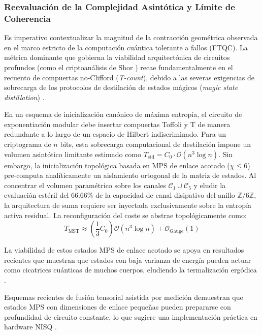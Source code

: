 \documentclass[12pt,a4paper]{article}
\theoremstyle{plain}
\theoremstyle{definition}
\theoremstyle{remark}
\begin{document}
\subsubsection*{Reevaluación de la Complejidad Asintótica y Límite de Coherencia}

Es imperativo contextualizar la magnitud de la contracción geométrica observada en el marco estricto de la computación cuántica tolerante a fallos (FTQC). La métrica dominante que gobierna la viabilidad arquitectónica de circuitos profundos (como el criptoanálisis de Shor \cite{Shor1994}) recae fundamentalmente en el recuento de compuertas no-Clifford (\textit{T-count}), debido a las severas exigencias de sobrecarga de los protocolos de destilación de estados mágicos (\textit{magic state distillation}) \cite{Gidney2021}.

En un esquema de inicialización canónico de máxima entropía, el circuito de exponentiación modular debe insertar compuertas Toffoli y T de manera redundante a lo largo de un espacio de Hilbert indiscriminado. Para un criptograma de $n$ bits, esta sobrecarga computacional de destilación impone un volumen asintótico limitante estimado como $T_{\text{std}} = C_0 \cdot \mathcal{O}(n^3 \log n)$. Sin embargo, la inicialización topológica basada en MPS de enlace acotado ($\chi \le 6$) pre-computa analíticamente un aislamiento ortogonal de la matriz de estados. Al concentrar el volumen paramétrico sobre los canales $\mathcal{C}_1 \cup \mathcal{C}_5$ y eludir la evaluación estéril del $66.66\%$ de la capacidad de canal disipativo del anillo $\mathbb{Z}/6\mathbb{Z}$, la arquitectura de suma requiere ser inyectada exclusivamente sobre la entropía activa residual. La reconfiguración del coste se abstrae topológicamente como:
\begin{equation}
T_{\text{MST}} \approx \left(\frac{1}{3} C_0 \right) \mathcal{O}(n^3 \log n) + \mathcal{O}_{\text{Gauge}}(1)
\label{eq:toffoli_reduction}
\end{equation}

La viabilidad de estos estados MPS de enlace acotado se apoya en resultados recientes que muestran que estados con baja varianza de energía pueden actuar como cicatrices cuánticas de muchos cuerpos, eludiendo la termalización ergódica \cite{Rai2024}.

Esquemas recientes de fusión tensorial asistida por medición demuestran que estados MPS con dimensiones de enlace pequeñas pueden prepararse con profundidad de circuito constante, lo que sugiere una implementación práctica en hardware NISQ \cite{Stephen2025}.
\end{document}
